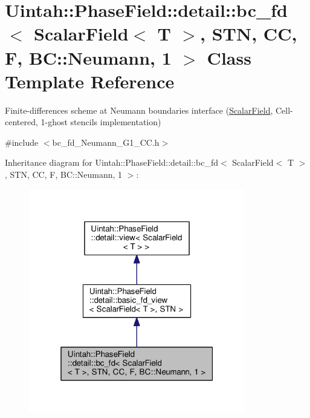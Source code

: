 \hypertarget{classUintah_1_1PhaseField_1_1detail_1_1bc__fd_3_01ScalarField_3_01T_01_4_00_01STN_00_01CC_00_01F_00_01BC_1_1Neumann_00_011_01_4}{}\section{Uintah\+:\+:Phase\+Field\+:\+:detail\+:\+:bc\+\_\+fd$<$ Scalar\+Field$<$ T $>$, S\+TN, CC, F, BC\+:\+:Neumann, 1 $>$ Class Template Reference}
\label{classUintah_1_1PhaseField_1_1detail_1_1bc__fd_3_01ScalarField_3_01T_01_4_00_01STN_00_01CC_00_01F_00_01BC_1_1Neumann_00_011_01_4}


Finite-\/differences scheme at Neumann boundaries interface (\hyperlink{structUintah_1_1PhaseField_1_1ScalarField}{Scalar\+Field}, Cell-\/centered, 1-\/ghost stencils implementation)  




{\ttfamily \#include $<$bc\+\_\+fd\+\_\+\+Neumann\+\_\+\+G1\+\_\+\+C\+C.\+h$>$}



Inheritance diagram for Uintah\+:\+:Phase\+Field\+:\+:detail\+:\+:bc\+\_\+fd$<$ Scalar\+Field$<$ T $>$, S\+TN, CC, F, BC\+:\+:Neumann, 1 $>$\+:\nopagebreak
\begin{figure}[H]
\begin{center}
\leavevmode
\includegraphics[width=268pt]{classUintah_1_1PhaseField_1_1detail_1_1bc__fd_3_01ScalarField_3_01T_01_4_00_01STN_00_01CC_00_01Fdd86f0a409be8e09970e05f4e95b5775}
\end{center}
\end{figure}



